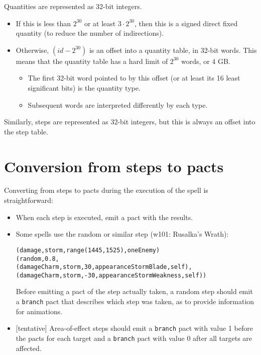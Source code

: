 \documentclass{article}
\begin{document}
Quantities are represented as 32-bit integers.

\begin{itemize}
  \item If this is less than $2^30$ or at least $3 \cdot 2^30$, then this is a signed direct fixed quantity (to reduce the number of indirections).
  \item Otherwise, $(id - 2^30)$ is an offset into a quantity table, in 32-bit words. This means that the quantity table has a hard limit of $2^30$ words, or 4 GB.
  \begin{itemize}
    \item The first 32-bit word pointed to by this offset (or at least its 16 least significant bits) is the quantity type.
    \item Subsequent words are interpreted differently by each type.
  \end{itemize}
\end{itemize}

Similarly, steps are represented as 32-bit integers, but this is always an offset into the step table.

\section{Conversion from steps to pacts}

Converting from steps to pacts during the execution of the spell is straightforward:

\begin{itemize}
  \item When each step is executed, emit a pact with the results.
  \item Some spells use the random or similar step (w101: Rusalka's Wrath):
\begin{alltt}
(damage, storm, range(1445, 1525), oneEnemy)
(random, 0.8,
  (damageCharm, storm, 30, appearanceStormBlade, self),
  (damageCharm, storm, -30, appearanceStormWeakness, self))
\end{alltt}
  Before emitting a pact of the step actually taken, a random step should emit a \texttt{branch} pact that describes which step was taken, as to provide information for animations.
  \item {[tentative]} Area-of-effect steps should emit a \texttt{branch} pact with value 1 before the pacts for each target and a \texttt{branch} pact with value 0 after all targets are affected.
\end{itemize}
\end{document}
